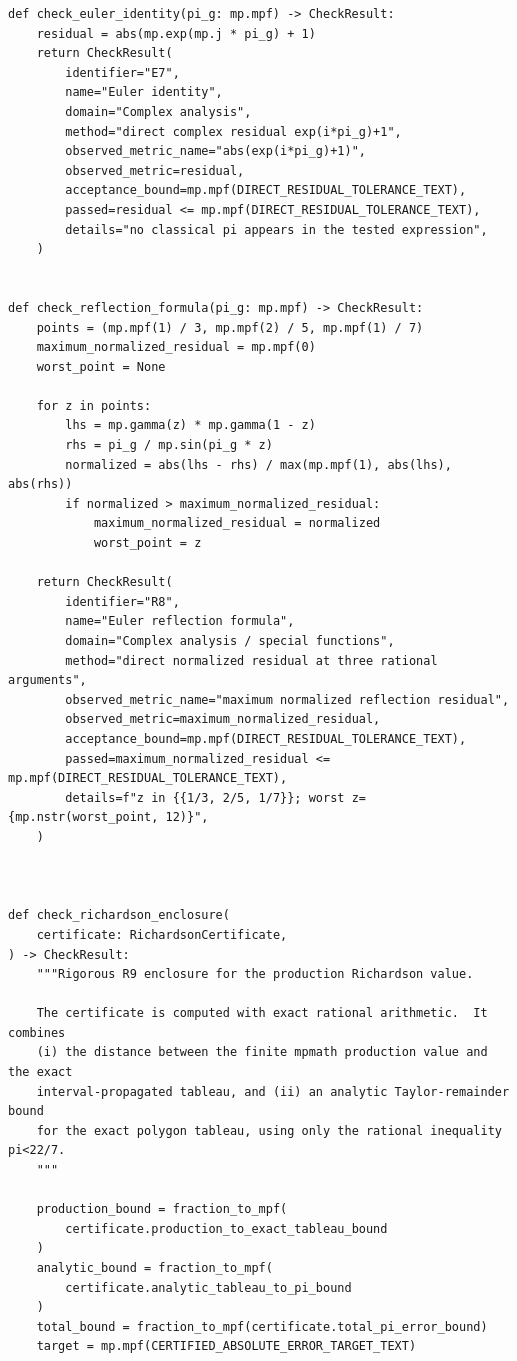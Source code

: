 \documentclass[11pt]{article}
\begin{document}
\begin{lstlisting}[style=pythonstyle,caption={Verification driver: \texttt{verify\_pi\_g\_identities.py}}]
def check_euler_identity(pi_g: mp.mpf) -> CheckResult:
    residual = abs(mp.exp(mp.j * pi_g) + 1)
    return CheckResult(
        identifier="E7",
        name="Euler identity",
        domain="Complex analysis",
        method="direct complex residual exp(i*pi_g)+1",
        observed_metric_name="abs(exp(i*pi_g)+1)",
        observed_metric=residual,
        acceptance_bound=mp.mpf(DIRECT_RESIDUAL_TOLERANCE_TEXT),
        passed=residual <= mp.mpf(DIRECT_RESIDUAL_TOLERANCE_TEXT),
        details="no classical pi appears in the tested expression",
    )


def check_reflection_formula(pi_g: mp.mpf) -> CheckResult:
    points = (mp.mpf(1) / 3, mp.mpf(2) / 5, mp.mpf(1) / 7)
    maximum_normalized_residual = mp.mpf(0)
    worst_point = None

    for z in points:
        lhs = mp.gamma(z) * mp.gamma(1 - z)
        rhs = pi_g / mp.sin(pi_g * z)
        normalized = abs(lhs - rhs) / max(mp.mpf(1), abs(lhs), abs(rhs))
        if normalized > maximum_normalized_residual:
            maximum_normalized_residual = normalized
            worst_point = z

    return CheckResult(
        identifier="R8",
        name="Euler reflection formula",
        domain="Complex analysis / special functions",
        method="direct normalized residual at three rational arguments",
        observed_metric_name="maximum normalized reflection residual",
        observed_metric=maximum_normalized_residual,
        acceptance_bound=mp.mpf(DIRECT_RESIDUAL_TOLERANCE_TEXT),
        passed=maximum_normalized_residual <= mp.mpf(DIRECT_RESIDUAL_TOLERANCE_TEXT),
        details=f"z in {{1/3, 2/5, 1/7}}; worst z={mp.nstr(worst_point, 12)}",
    )



def check_richardson_enclosure(
    certificate: RichardsonCertificate,
) -> CheckResult:
    """Rigorous R9 enclosure for the production Richardson value.

    The certificate is computed with exact rational arithmetic.  It combines
    (i) the distance between the finite mpmath production value and the exact
    interval-propagated tableau, and (ii) an analytic Taylor-remainder bound
    for the exact polygon tableau, using only the rational inequality pi<22/7.
    """

    production_bound = fraction_to_mpf(
        certificate.production_to_exact_tableau_bound
    )
    analytic_bound = fraction_to_mpf(
        certificate.analytic_tableau_to_pi_bound
    )
    total_bound = fraction_to_mpf(certificate.total_pi_error_bound)
    target = mp.mpf(CERTIFIED_ABSOLUTE_ERROR_TARGET_TEXT)


\end{lstlisting}
\end{document}
